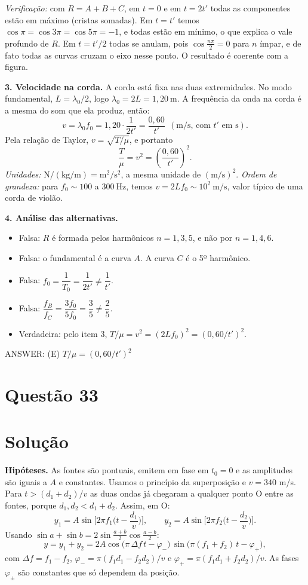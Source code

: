 \documentclass{article}%
\begin{document}
\emph{Verificação:} com $R=A+B+C$, em $t=0$ e em $t=2t'$ todas as componentes estão em máximo (cristas somadas). Em $t=t'$ temos $\cos\pi=\cos 3\pi=\cos 5\pi=-1$, e todas estão em mínimo, o que explica o vale profundo de $R$. Em $t=t'/2$ todas se anulam, pois $\cos\frac{n\pi}{2}=0$ para $n$ ímpar, e de fato todas as curvas cruzam o eixo nesse ponto. O resultado é coerente com a figura.

\textbf{3. Velocidade na corda.} A corda está fixa nas duas extremidades. No modo fundamental, $L=\lambda_0/2$, logo $\lambda_0=2L=1{,}20\ \text{m}$. A frequência da onda na corda é a mesma do som que ela produz, então:
\[
v=\lambda_0 f_0=1{,}20\cdot\frac{1}{2t'}=\frac{0{,}60}{t'}\ \ (\text{m/s, com } t' \text{ em s}).
\]
Pela relação de Taylor, $v=\sqrt{T/\mu}$, e portanto
\[
\frac{T}{\mu}=v^2=\left(\frac{0{,}60}{t'}\right)^2 .
\]
\emph{Unidades:} $\text{N}/(\text{kg/m})=\text{m}^2/\text{s}^2$, a mesma unidade de $(\text{m}/\text{s})^2$. \emph{Ordem de grandeza:} para $f_0\sim 100$ a $300\ \text{Hz}$, temos $v=2Lf_0\sim 10^2\ \text{m/s}$, valor típico de uma corda de violão.

\textbf{4. Análise das alternativas.}
\begin{itemize}
\item[(A)] Falsa: $R$ é formada pelos harmônicos $n=1,3,5$, e não por $n=1,4,6$.
\item[(B)] Falsa: o fundamental é a curva $A$. A curva $C$ é o 5º harmônico.
\item[(C)] Falsa: $f_0=\dfrac{1}{T_0}=\dfrac{1}{2t'}\neq\dfrac{1}{t'}$.
\item[(D)] Falsa: $\dfrac{f_B}{f_C}=\dfrac{3f_0}{5f_0}=\dfrac{3}{5}\neq\dfrac{2}{5}$.
\item[(E)] Verdadeira: pelo item 3, $T/\mu=v^2=(2Lf_0)^2=(0{,}60/t')^2$.
\end{itemize}

ANSWER: (E) $T/\mu=(0{,}60/t')^2$%
\newpage%
\section*{Questão 33}

\section*{Solução}

\textbf{Hipóteses.} As fontes são pontuais, emitem em fase em $t_0=0$ e as amplitudes são iguais a $A$ e constantes. Usamos o princípio da superposição e $v=340$ m/s. Para $t>(d_1+d_2)/v$ as duas ondas já chegaram a qualquer ponto O entre as fontes, porque $d_1,d_2<d_1+d_2$. Assim, em O:
\[
y_1=A\sin\!\Big[2\pi f_1\Big(t-\frac{d_1}{v}\Big)\Big],\qquad
y_2=A\sin\!\Big[2\pi f_2\Big(t-\frac{d_2}{v}\Big)\Big].
\]
Usando $\sin a+\sin b=2\sin\frac{a+b}{2}\cos\frac{a-b}{2}$:
\[
y=y_1+y_2=2A\cos\!\big(\pi\,\Delta f\,t-\varphi_-\big)\,\sin\!\big(\pi(f_1+f_2)\,t-\varphi_+\big),
\]
com $\Delta f=f_1-f_2$, $\varphi_-=\pi(f_1d_1-f_2d_2)/v$ e $\varphi_+=\pi(f_1d_1+f_2d_2)/v$. As fases $\varphi_\pm$ são constantes que só dependem da posição.
\end{document}
